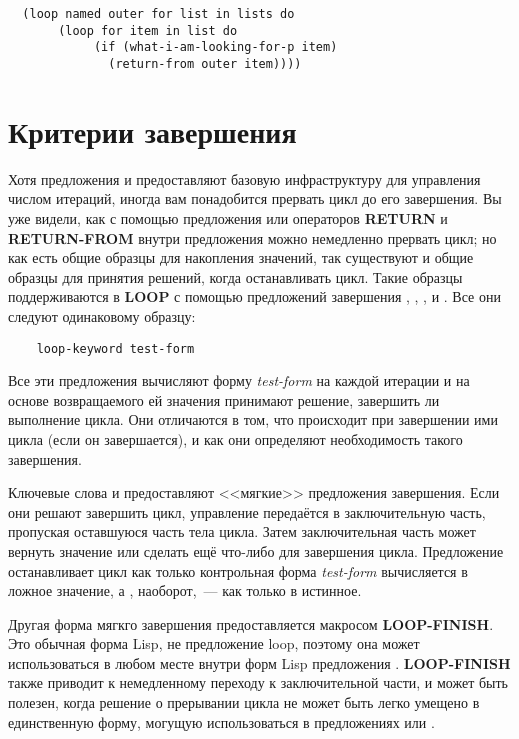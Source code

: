 \begin{lstlisting}
  (loop named outer for list in lists do
       (loop for item in list do
            (if (what-i-am-looking-for-p item)
              (return-from outer item))))
\end{lstlisting}

\section{Критерии завершения}

Хотя предложения  и  предоставляют базовую инфраструктуру для
управления числом итераций, иногда вам понадобится прервать цикл до его завершения. Вы уже
видели, как с помощью предложения  или операторов \textbf{RETURN} и
\textbf{RETURN-FROM} внутри предложения  можно немедленно прервать цикл; но как
есть общие образцы для накопления значений, так существуют и общие образцы для принятия
решений, когда останавливать цикл. Такие образцы поддерживаются в \textbf{LOOP} с помощью
предложений завершения , , ,  и
. Все они следуют одинаковому образцу:

\begin{verbatim}
    loop-keyword test-form
\end{verbatim}

Все эти предложения вычисляют форму \textit{test-form} на каждой итерации и на основе
возвращаемого ей значения принимают решение, завершить ли выполнение цикла. Они отличаются
в том, что происходит при завершении ими цикла (если он завершается), и как они определяют
необходимость такого завершения.

Ключевые слова   и  предоставляют <<мягкие>> предложения
завершения. Если они решают завершить цикл, управление передаётся в заключительную часть,
пропуская оставшуюся часть тела цикла. Затем заключительная часть может вернуть значение
или сделать ещё что-либо для завершения цикла. Предложение  останавливает цикл
как только контрольная форма \textit{test-form} вычисляется в ложное значение, а
, наоборот,~--- как только в истинное.

Другая форма мягкго завершения предоставляется макросом \textbf{LOOP-FINISH}. Это обычная
форма Lisp, не предложение loop, поэтому она может использоваться в любом месте внутри
форм Lisp предложения . \textbf{LOOP-FINISH} также приводит к немедленному
переходу к заключительной части, и может быть полезен, когда решение о прерывании цикла не
может быть легко умещено в единственную форму, могущую использоваться в предложениях
 или .

